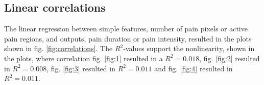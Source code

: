 \begin{figure} [b!]
\end{figure}

\subsection*{Linear correlations}
The linear regression between simple features, number of pain pixels or active pain regions, and outputs, pain duration or pain intensity, resulted in the plots shown in fig. \ref{fig:correlations}. The $R^2$-values support the nonlinearity, shown in the plots, where correlation fig. \ref{fig:1} resulted in a $R^2 = 0.018$, fig. \ref{fig:2} resulted in $R^2 = 0.008$, fig. \ref{fig:3} resulted in $R^2 = 0.011$ and fig. \ref{fig:4} resulted in $R^2 =  0.011$. 

